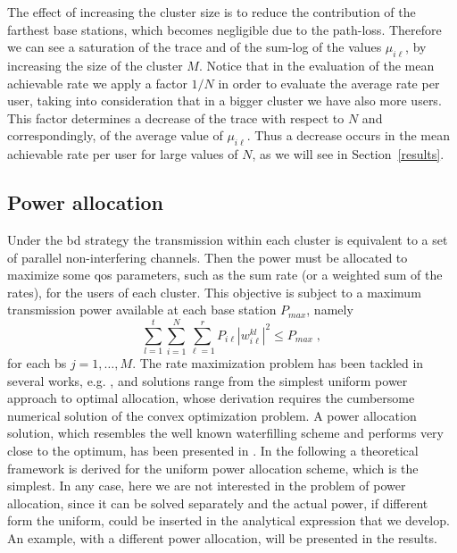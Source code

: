 The effect of increasing the cluster size is to reduce the contribution of the farthest base stations, which becomes negligible due to the path-loss. Therefore we can see a saturation of the trace and of the sum-log of the values $\mu_{i\ell}$, by increasing the size of the cluster $M$. Notice that in the evaluation of the mean achievable rate we apply a factor $1/N$ in order to evaluate the average rate per user, taking into consideration that in a bigger cluster we have also more users. This factor determines a decrease of the trace with respect to $N$ and correspondingly, of the average value of $\mu_{i\ell}$. Thus a decrease occurs in the mean achievable rate per user for large values of $N$, as we will see in Section~\ref{results}.


\subsection{Power allocation}

Under the \gls{bd} strategy the transmission within each cluster is equivalent to a set of parallel non-interfering channels. Then the power must be allocated to maximize some \gls{qos} parameters, such as the sum rate (or a weighted sum
of the rates), for the users of each cluster. This objective is subject to a maximum transmission power available at each base station $P_{max}$, namely
\begin{equation}
	\sum_{l=1}^{t} \sum_{i=1}^{N}\sum_{\ell=1}^{r} P_{i\ell} \left|w_{i\ell}^{kl}\right|^2 \leq P_{max}\;,
 \label{constraints}
\end{equation}
for each \gls{bs} $j=1,\ldots,M$. The rate maximization problem has been tackled in several works, e.g. \cite{shim08},\cite{armada11b} and solutions range from the simplest uniform power approach to optimal allocation, whose derivation requires the cumbersome numerical solution of the convex optimization problem. A power allocation solution, which resembles the well known waterfilling scheme and performs very close to the optimum, has been presented in \cite{armada11b}. 
In the following a theoretical framework is derived for the uniform power allocation scheme, which is the simplest. In any case, here we are not interested in the problem of power allocation, since it can be solved separately and the actual power, if different form the uniform, could be inserted in the analytical expression that we develop. An example, with a different power allocation, will be presented in the results.

